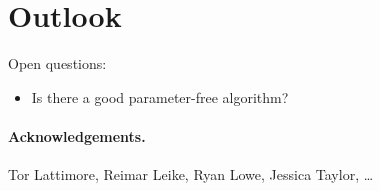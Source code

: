 \documentclass[a4paper]{article}
\begin{document}
\section{Outlook}

Open questions:
\begin{itemize}
\item Is there a good parameter-free algorithm?
\end{itemize}


\paragraph{Acknowledgements.}
Tor Lattimore, Reimar Leike, Ryan Lowe, Jessica Taylor, \dots


\end{document}
